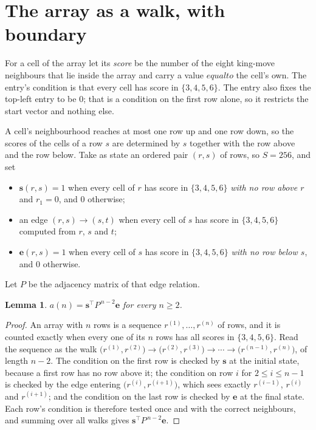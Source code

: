 \documentclass[11pt,a4paper]{article}
\theoremstyle{plain}
\newtheorem{lemma}[theorem]{Lemma}
\theoremstyle{definition}
\begin{document}
\section{The array as a walk, with boundary}

For a cell of the array let its \emph{score} be the number of the eight king-move neighbours that lie inside
the array and carry a value $equal to$ the cell's own. The entry's condition is that every cell
has score in $\{3,4,5,6\}$. The entry also fixes the top-left entry to be $0$; that is a condition on the first row alone, so it restricts the start vector and nothing else.

A cell's neighbourhood reaches at most one row up and one row down, so the scores of the
cells of a row $s$ are determined by $s$ together with the row above and the row below.
Take as state an ordered pair $(r,s)$ of rows, so $S=256$, and set
\begin{itemize}
\item $\mathbf{s}(r,s)=1$ when every cell of $r$ has score in $\{3,4,5,6\}$ \emph{with no row
above $r$} and $r_1=0$, and $0$ otherwise;
\item an edge $(r,s)\to(s,t)$ when every cell of $s$ has score in $\{3,4,5,6\}$ computed from
$r$, $s$ and $t$;
\item $\mathbf{e}(r,s)=1$ when every cell of $s$ has score in $\{3,4,5,6\}$ \emph{with no row
below $s$}, and $0$ otherwise.
\end{itemize}
Let $P$ be the adjacency matrix of that edge relation.

\begin{lemma}\label{lem:walk}
$a(n)=\mathbf{s}^{\!\top}P^{\,n-2}\mathbf{e}$ for every $n\ge2$.
\end{lemma}

\begin{proof}
An array with $n$ rows is a sequence $r^{(1)},\dots,r^{(n)}$ of rows, and it is counted
exactly when every one of its $n$ rows has all scores in $\{3,4,5,6\}$. Read the sequence as the
walk $\bigl(r^{(1)},r^{(2)}\bigr)\to\bigl(r^{(2)},r^{(3)}\bigr)\to\cdots\to
\bigl(r^{(n-1)},r^{(n)}\bigr)$, of length $n-2$. The condition on the first row is
checked by $\mathbf{s}$ at the initial state, because a first row has no row above it; the
condition on row $i$ for $2\le i\le n-1$ is checked by the edge entering
$\bigl(r^{(i)},r^{(i+1)}\bigr)$, which sees exactly $r^{(i-1)}$, $r^{(i)}$ and
$r^{(i+1)}$; and the condition on the last row is checked by $\mathbf{e}$ at the final
state. Each row's condition is therefore tested once and with the correct neighbours, and
summing over all walks gives $\mathbf{s}^{\!\top}P^{\,n-2}\mathbf{e}$.
\end{proof}
\end{document}
